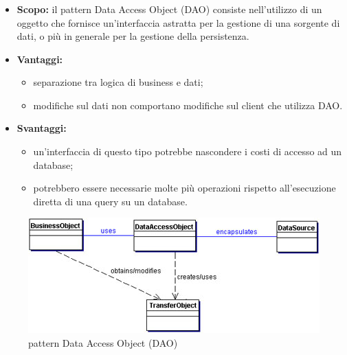    \subsubsection{}
      \begin{itemize}
       \item \textbf{Scopo:} il pattern Data Access Object (DAO) consiste nell'utilizzo di un oggetto che fornisce un'interfaccia astratta per la gestione di una sorgente di dati, o più in generale per la gestione della persistenza.
	\item \textbf{Vantaggi:}
	  \begin{itemize}
	   \item separazione tra logica di business e dati;
	   \item modifiche sul dati non comportano modifiche sul client che utilizza DAO.
	  \end{itemize}
	\item \textbf{Svantaggi:}
	  \begin{itemize}
	   \item un'interfaccia di questo tipo potrebbe nascondere i costi di accesso ad un database;
	   \item potrebbero essere necessarie molte più operazioni rispetto all'esecuzione diretta di una query su un database.
	  \end{itemize}
	\end{itemize}
	\begin{figure}[h]
		\centering
		\includegraphics[width=\textwidth,height=\textheight,keepaspectratio,scale=0.1]{images/DAOpattern.jpg}
		\caption{pattern Data Access Object (DAO)}\label{fig:dao1}
	\end{figure}
		\newpage
